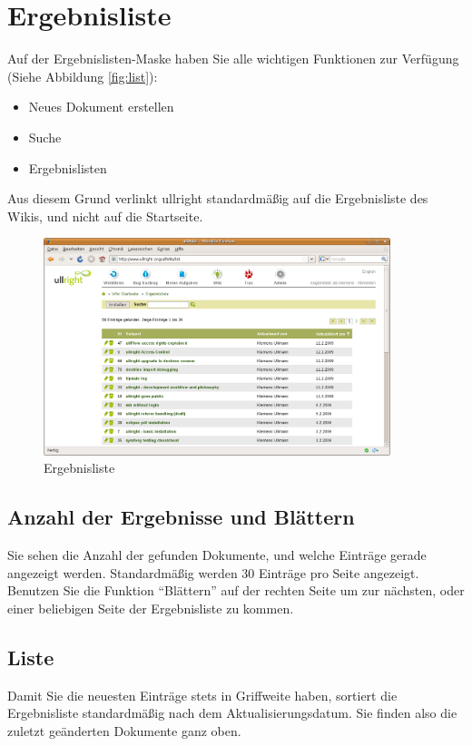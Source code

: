 \documentclass[article, a4paper, oneside, 11pt]{memoir}
\begin{document}
\section{Ergebnisliste}
Auf der Ergebnislisten-Maske haben Sie alle wichtigen Funktionen zur Verfügung (Siehe Abbildung \vref{fig:list}):

\begin{itemize}
\item Neues Dokument erstellen
\item Suche
\item Ergebnislisten
\end{itemize}
Aus diesem Grund verlinkt ullright standardmäßig auf die Ergebnisliste des Wikis, und nicht auf die Startseite.

\begin{figure}[htp]
\centering
\includegraphics[width=0.9\textwidth]{list}
\caption{Ergebnisliste}
\label{fig:list}
\end{figure}


\subsection{Anzahl der Ergebnisse und Blättern}
Sie sehen die Anzahl der gefunden Dokumente, und welche Einträge gerade angezeigt werden. Standardmäßig werden 30 Einträge pro Seite angezeigt. Benutzen Sie die Funktion "`Blättern"' auf der rechten Seite um zur nächsten, oder einer beliebigen Seite der Ergebnisliste zu kommen.

\subsection{Liste}
Damit Sie die neuesten Einträge stets in Griffweite haben, sortiert die Ergebnisliste standardmäßig nach dem Aktualisierungsdatum. Sie finden also die zuletzt geänderten Dokumente ganz oben.
\end{document}
